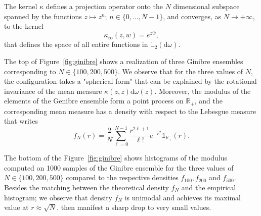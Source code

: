 \documentclass[twoside,11pt]{book}
\numberwithin{theorem}{chapter}
\numberwithin{definition}{chapter}
\numberwithin{proposition}{chapter}
\numberwithin{corollary}{chapter}
\numberwithin{example}{chapter}
\numberwithin{lemma}{chapter}
\numberwithin{assumption}{chapter}
\begin{document}



The kernel $\kappa$ defines a projection operator onto the $N$ dimensional subspace spanned by the functions $z \mapsto z^{n}$; $n \in \{0, \dots, N-1 \}$, and converges, as $N \rightarrow +\infty$, to the kernel
\begin{equation}
\kappa_{\infty}(z,w) = e^{z \overline{w}},
\end{equation} 
that defines the space
of all entire functions in $\mathbb{L}_{2}(\mathrm{d}\omega)$. 

The top of Figure~\ref{fig:ginibre} shows a  realization of three Ginibre ensembles corresponding to $N \in \{100,200,500\}$. We observe that for the three values of $N$, the configuration takes a "spherical form" that can be explained by the rotational invariance of the mean measure $\kappa(z,z) \mathrm{d}\omega(z)$. Moreover, the modulus of the elements of the Genibre ensemble form a point process on $\mathbb{R}_{+}$, and the corresponding mean measure has a density with respect to the Lebesgue measure that writes
\begin{equation}
f_{N}(r) = \frac{2}{N}\sum\limits_{\ell =0}^{N-1} \frac{r^{2\ell+1}}{\ell!}e^{-r^{2}} \mathbb{1}_{\mathbb{R}_{+}}(r).
\end{equation}

The bottom of the Figure~\ref{fig:ginibre} shows histograms of the modulus computed on 1000 samples of the Ginibre ensemble for the three values of $N \in \{100,200,500\}$  compared to the respective densities $f_{100},f_{200}$ and $f_{500}$. Besides the matching between the theoretical density $f_{N}$ and the empirical histogram; we observe that density $f_{N}$ is unimodal and achieves its maximal value at $r \approx \sqrt{N}$, then manifest a sharp drop to very small values.


\end{document}

